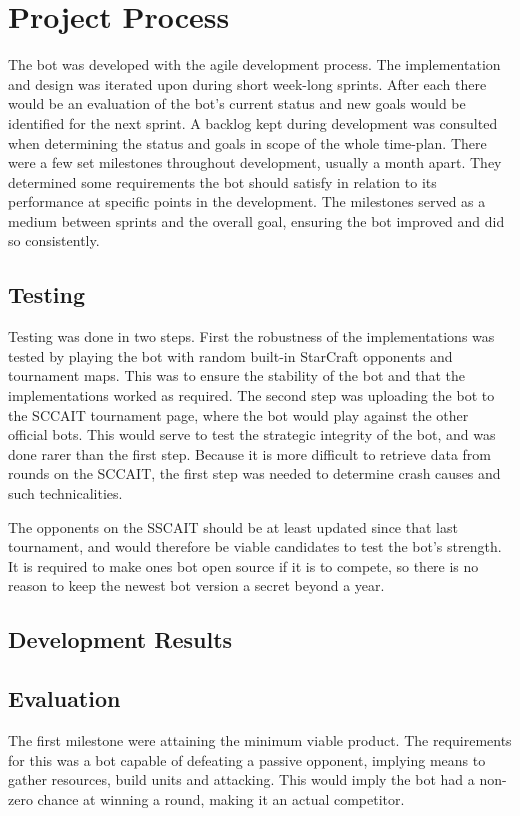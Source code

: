 \chapter{Project Process}
The bot was developed with the agile development process. The implementation and design was iterated upon during short week-long sprints. After each there would be an evaluation of the bot's current status and new goals would be identified for the next sprint. A backlog kept during development was consulted when determining the status and goals in scope of the whole time-plan. There were a few set milestones throughout development, usually a month apart. They determined some requirements the bot should satisfy in relation to its performance at specific points in the development. The milestones served as a medium between sprints and the overall goal, ensuring the bot improved and did so consistently.

\section{Testing}
Testing was done in two steps. First the robustness of the implementations was tested by playing the bot with random built-in StarCraft opponents and tournament maps. This was to ensure the stability of the bot and that the implementations worked as required. The second step was uploading the bot to the SCCAIT tournament page, where the bot would play against the other official bots. This would serve to test the strategic integrity of the bot, and was done rarer than the first step. Because it is more difficult to retrieve data from rounds on the SCCAIT, the first step was needed to determine crash causes and such technicalities.

The opponents on the SSCAIT should be at least updated since that last tournament, and would therefore be viable candidates to test the bot's strength. It is required to make ones bot open source if it is to compete, so there is no reason to keep the newest bot version a secret beyond a year.

\section{Development Results}

\section{Evaluation}
The first milestone were attaining the minimum viable product. The requirements for this was a bot capable of defeating a passive opponent, implying means to gather resources, build units and attacking. This would imply the bot had a non-zero chance at winning a round, making it an actual competitor.



